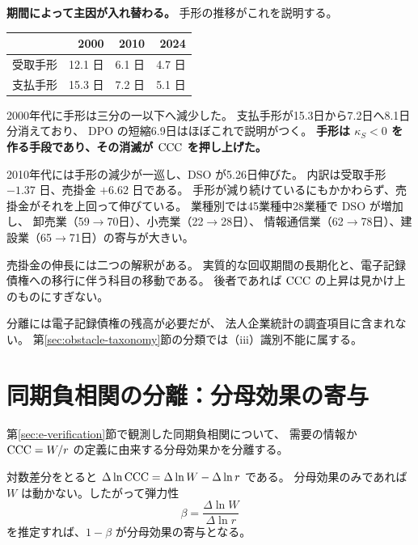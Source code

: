 \textbf{期間によって主因が入れ替わる。} 手形の推移がこれを説明する。

\begin{center}
\begin{tabular}{@{}lrrr@{}}
\toprule
 & 2000 & 2010 & 2024 \\
\midrule
受取手形 & 12.1 日 & 6.1 日 & 4.7 日 \\
支払手形 & 15.3 日 & 7.2 日 & 5.1 日 \\
\bottomrule
\end{tabular}
\label{tab:tegata-trend}
\end{center}

2000年代に手形は三分の一以下へ減少した。
支払手形が15.3日から7.2日へ8.1日分消えており、
DPO の短縮6.9日はほぼこれで説明がつく。
\textbf{手形は $\kappa_S<0$ を作る手段であり、その消滅が $\mathrm{CCC}$ を押し上げた。}

2010年代には手形の減少が一巡し、DSO が5.26日伸びた。
内訳は受取手形 $-1.37$ 日、売掛金 $+6.62$ 日である。
手形が減り続けているにもかかわらず、売掛金がそれを上回って伸びている。
業種別では45業種中28業種で $\mathrm{DSO}$ が増加し、
卸売業（59$\to$70日）、小売業（22$\to$28日）、
情報通信業（62$\to$78日）、建設業（65$\to$71日）の寄与が大きい。

\begin{remark}[科目移動と分離できない]
\label{rem:densai}
売掛金の伸長には二つの解釈がある。
実質的な回収期間の長期化と、電子記録債権への移行に伴う科目の移動である。
後者であれば $\mathrm{CCC}$ の上昇は見かけ上のものにすぎない。

分離には電子記録債権の残高が必要だが、
法人企業統計の調査項目に含まれない。
第\ref{sec:obstacle-taxonomy}節の分類では（iii）識別不能に属する。
\end{remark}

\section{同期負相関の分離：分母効果の寄与}
\label{sec:denominator-effect}

第\ref{sec:e-verification}節で観測した同期負相関について、
需要の情報か $\mathrm{CCC}=W/r$ の定義に由来する分母効果かを分離する。

対数差分をとると $\Delta\ln\mathrm{CCC} = \Delta\ln W - \Delta\ln r$ である。
分母効果のみであれば $W$ は動かない。したがって弾力性
\begin{equation}
\beta = \frac{\Delta \ln W}{\Delta \ln r}
\label{eq:wc-elasticity}
\end{equation}
を推定すれば、$1-\beta$ が分母効果の寄与となる。

